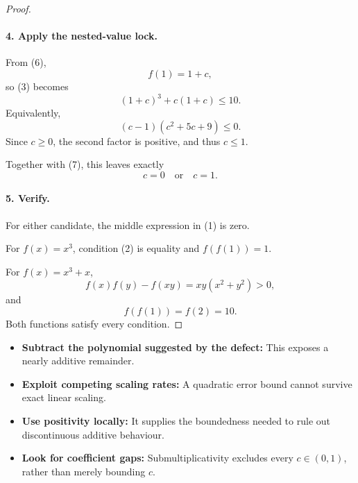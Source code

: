 \begin{dlsummary}[title={\bfseries Solution 67. The Forbidden Coefficient},breakable]
\begin{proof}
\paragraph{4. Apply the nested-value lock.}

From (6),
\[
f(1)=1+c,
\]
so (3) becomes
\[
(1+c)^3+c(1+c)\le10.
\]
Equivalently,
\[
(c-1)(c^2+5c+9)\le0.
\]
Since \(c\ge0\), the second factor is positive, and thus \(c\le1\).

Together with (7), this leaves exactly
\[
c=0\quad\text{or}\quad c=1.
\]

\paragraph{5. Verify.}

For either candidate, the middle expression in (1) is zero.

For \(f(x)=x^3\), condition (2) is equality and \(f(f(1))=1\).

For \(f(x)=x^3+x\),
\[
f(x)f(y)-f(xy)=xy(x^2+y^2)>0,
\]
and
\[
f(f(1))=f(2)=10.
\]
Both functions satisfy every condition.
\end{proof}
\end{dlsummary}

\begin{takeaways}
\begin{itemize}
\item \textbf{Subtract the polynomial suggested by the defect:} This exposes a nearly additive remainder.
\item \textbf{Exploit competing scaling rates:} A quadratic error bound cannot survive exact linear scaling.
\item \textbf{Use positivity locally:} It supplies the boundedness needed to rule out discontinuous additive behaviour.
\item \textbf{Look for coefficient gaps:} Submultiplicativity excludes every \(c\in(0,1)\), rather than merely bounding \(c\).
\end{itemize}
\end{takeaways}
